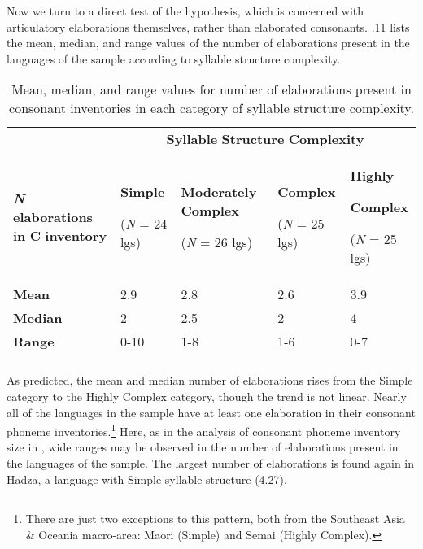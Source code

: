  Now we turn to a direct test of the hypothesis, which is concerned with articulatory elaborations themselves, rather than elaborated consonants. .11 lists the mean, median, and range values of the number of elaborations present in the languages of the sample according to syllable structure complexity.






\begin{table}
\begin{tabularx}{\textwidth}{XXXXX}
 & \multicolumn{4}{c}{ \textbf{Syllable} \textbf{Structure} \textbf{Complexity}}\\
\lsptoprule
\textbf{\textit{N}} \textbf{elaborations} \textbf{in} \textbf{C} \textbf{inventory} & { \textbf{Simple}}

 (\textit{N} = 24 lgs) & { \textbf{Moderately} \textbf{Complex}}

 (\textit{N} = 26 lgs) & { \textbf{Complex}}

 (\textit{N} = 25 lgs) & { \textbf{Highly} }

{ \textbf{Complex}}

 (\textit{N} = 25 lgs)\\
\textbf{Mean} & 2.9 & 2.8 & 2.6 & 3.9\\
\textbf{Median} & 2 & 2.5 & 2 & 4\\
\textbf{Range} & 0-10 & 1-8 & 1-6 & 0-7\\
\lspbottomrule
\end{tabularx}
\caption{\label{4.11}Mean, median, and range values for number of elaborations present in consonant inventories in each category of syllable structure complexity.}
\end{table}




  As predicted, the mean and median number of elaborations rises from the Simple category to the Highly Complex category, though the trend is not linear. Nearly all of the languages in the sample have at least one elaboration in their consonant phoneme inventories.\footnote{ \textrm{There are just two exceptions to this pattern, both from the Southeast Asia \& Oceania macro-area: Maori (Simple) and Semai (Highly Complex).} } Here, as in the analysis of consonant phoneme inventory size in , wide ranges may be observed in the number of elaborations present in the languages of the sample. The largest number of elaborations is found again in Hadza, a language with Simple syllable structure (4.27).




